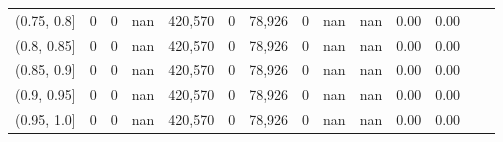 \begin{tabular}{rrrrrrrrrrrrrr}
(0.75, 0.8]    &        0 &       0 &    nan &  420,570 &        0 &  78,926 &       0 &   nan &   nan &  0.00 &      0.00 \\
(0.8, 0.85]    &        0 &       0 &    nan &  420,570 &        0 &  78,926 &       0 &   nan &   nan &  0.00 &      0.00 \\
(0.85, 0.9]    &        0 &       0 &    nan &  420,570 &        0 &  78,926 &       0 &   nan &   nan &  0.00 &      0.00 \\
(0.9, 0.95]    &        0 &       0 &    nan &  420,570 &        0 &  78,926 &       0 &   nan &   nan &  0.00 &      0.00 \\
(0.95, 1.0]    &        0 &       0 &    nan &  420,570 &        0 &  78,926 &       0 &   nan &   nan &  0.00 &      0.00 \\
\bottomrule
\end{tabular}
